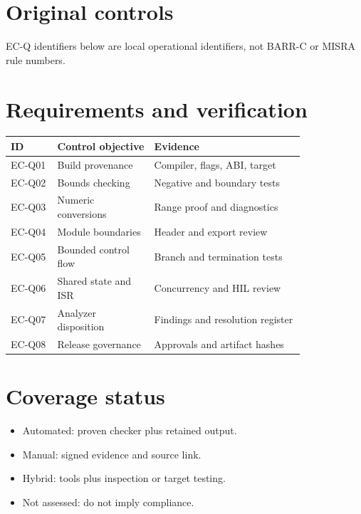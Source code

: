 \documentclass[10pt,letterpaper]{article}
\begin{document}
\makedoctitle
\makedocsummary
\section{Original controls}
EC-Q identifiers below are local operational identifiers, not BARR-C or MISRA rule numbers.
\section{Requirements and verification}
\begin{longtable}{p{0.13\linewidth}p{0.27\linewidth}p{0.42\linewidth}}\toprule ID & Control objective & Evidence\\\midrule\endhead
EC-Q01 & Build provenance & Compiler, flags, ABI, target\\
EC-Q02 & Bounds checking & Negative and boundary tests\\
EC-Q03 & Numeric conversions & Range proof and diagnostics\\
EC-Q04 & Module boundaries & Header and export review\\
EC-Q05 & Bounded control flow & Branch and termination tests\\
EC-Q06 & Shared state and ISR & Concurrency and HIL review\\
EC-Q07 & Analyzer disposition & Findings and resolution register\\
EC-Q08 & Release governance & Approvals and artifact hashes\\
\bottomrule\end{longtable}
\section{Coverage status}
\begin{itemize}
\item Automated: proven checker plus retained output.
\item Manual: signed evidence and source link.
\item Hybrid: tools plus inspection or target testing.
\item Not assessed: do not imply compliance.
\end{itemize}
\end{document}
